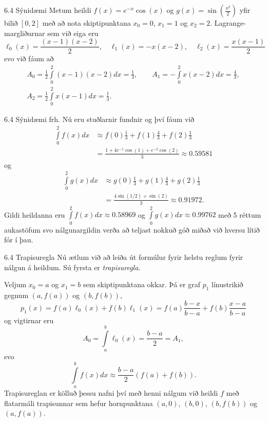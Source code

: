 \begin{frame}{6.4 Sýnidæmi} 
Metum heildi $f(x) = e^{-x}\cos(x)$ og $g(x) = \sin (\frac{x^2}{2})$
yfir bilið $[0,2]$ með að nota skiptipunktana $x_0 = 0$, $x_1 = 1$ og
$x_2 = 2$. Lagrange-margliðurnar sem við eiga eru 
\begin{equation*}
  \ell_0(x) = \frac{(x-1)(x-2)}{2}, \quad
  \ell_1(x) = -x(x-2), \quad
  \ell_2(x) = \frac{x(x-1)}{2}
\end{equation*}
\pause
svo við fáum að
\begin{gather*}
  A_0 = \frac{1}{2} \int\limits_0^2 (x-1)(x-2) dx = \frac{1}{3},
  \qquad
  A_1 = -\int\limits_0^2 x(x-2) dx = \frac{4}{3}, \\
  A_2 = \frac{1}{2} \int\limits_0^2 x(x-1) dx = \frac{1}{3}.
\end{gather*}
\end{frame}


\begin{frame}{6.4 Sýnidæmi frh.} 
Nú eru stuðlarnir fundnir og því fáum við 
\begin{align*}
  \int\limits_0^2 f(x) dx &\approx
  f(0)\frac{1}{3} + f(1)\frac{4}{3} + f(2)\frac{1}{3}\\
  &= \frac{1 + 4e^{-1}\cos(1) + e^{-2}\cos(2)}{3}
  \approx 0.59581
\end{align*}
og
\begin{align*}
  \int\limits_0^2 g(x) dx &\approx
  g(0)\frac{1}{3} + g(1)\frac{4}{3} + g(2)\frac{1}{3}\\
 & = \frac{4\sin(1/2) + \sin(2)}{3} 
  \approx 0.91972.
\end{align*}
\pause
Gildi heildanna eru
$\int\limits_0^2 f(x) dx \approx 0.58969$
og $\int\limits_0^2 g(x) dx \approx 0.99762$ með 5 réttum auka\-stöfum
svo nálgunargildin verða að teljast nokkuð góð miðað við hversu 
lítið fór í þau.
\end{frame}


\begin{frame}{6.4 Trapisuregla} 
Nú ætlum við að leiða út formúlur fyrir helstu reglum fyrir nálgun á
heildum.  Sú fyrsta er {\it trapisuregla}.

\pause
\smallskip
Veljum $x_0 = a$ og $x_1 = b$ sem skiptipunktana okkar. Þá er
graf $p_1$ línustrikið gegnum $(a,f(a))$ og $(b,f(b))$, 
\begin{equation*}
  p_1(x) = f(a) \ell_0(x) + f(b) \ell_1(x)
  = f(a)\frac{b-x}{b-a} + f(b) \frac{x-a}{b-a}
\end{equation*}
og vigtirnar eru
\begin{equation*}
  A_0 = \int\limits_a^b \ell_0(x) = \frac{b-a}{2} = A_1,
\end{equation*}
svo
\begin{equation*}
  \int\limits_a^b f(x) dx \approx 
  \frac{b-a}{2}\left(f(a)+f(b)\right).
\end{equation*}
Trapisureglan er kölluð þessu nafni því með henni nálgum við heildi
$f$ með flatarmáli trapisunnar sem hefur hornpunktana $(a,0)$,
$(b,0)$, $(b,f(b))$ og $(a,f(a))$. 
\end{frame}


